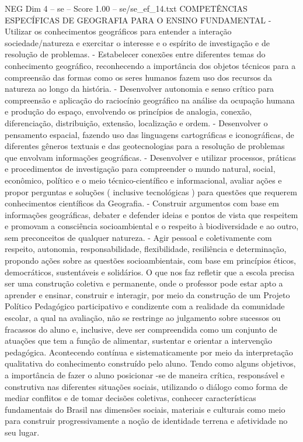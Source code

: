 \begin{textsample}{NEG Dim 4 – se – Score 1.00 – se/se\_ef\_14.txt}  \label{ex:f4_neg_150}
COMPETÊNCIAS ESPECÍFICAS DE GEOGRAFIA PARA O ENSINO FUNDAMENTAL - Utilizar os conhecimentos geográficos para entender a interação sociedade/natureza e exercitar o interesse e o espírito de investigação e de resolução de problemas. - Estabelecer conexões entre diferentes temas do conhecimento geográfico, reconhecendo a importância dos objetos técnicos para a compreensão das formas como os seres humanos fazem uso dos recursos da natureza ao longo da história. - Desenvolver autonomia e senso crítico para compreensão e aplicação do raciocínio geográfico na análise da ocupação humana e produção do espaço, envolvendo os princípios de analogia, conexão, diferenciação, distribuição, extensão, localização e ordem. - Desenvolver o pensamento espacial, fazendo uso das linguagens cartográficas e iconográficas, de diferentes gêneros textuais e das geotecnologias para a resolução de problemas que envolvam informações geográficas. - Desenvolver e utilizar processos, práticas e procedimentos de investigação para compreender o mundo natural, social, econômico, político e o meio técnico-científico e informacional, avaliar ações e propor perguntas e soluções ( inclusive tecnológicas ) para questões que requerem conhecimentos científicos da Geografia. - Construir argumentos com base em informações geográficas, debater e defender ideias e pontos de vista que respeitem e promovam a consciência socioambiental e o respeito à biodiversidade e ao outro, sem preconceitos de qualquer natureza. - Agir pessoal e coletivamente com respeito, autonomia, responsabilidade, flexibilidade, resiliência e determinação, propondo ações sobre as questões socioambientais, com base em princípios éticos, democráticos, sustentáveis e solidários.
O que nos faz refletir que a escola precisa ser uma construção coletiva e permanente, onde o professor pode estar apto a aprender e ensinar, construir e interagir, por meio da construção de um Projeto Político Pedagógico participativo e condizente com a realidade da comunidade escolar, a qual na avaliação, não se restringe ao julgamento sobre sucessos ou fracassos do aluno e, inclusive, deve ser compreendida como um conjunto de atuações que tem a função de alimentar, sustentar e orientar a intervenção pedagógica.
Acontecendo contínua e sistematicamente por meio da interpretação qualitativa do conhecimento construído pelo aluno.
Tendo como alguns objetivos, a importância de fazer o aluno posicionar -se de maneira crítica, responsável e construtiva nas diferentes situações sociais, utilizando o diálogo como forma de mediar conflitos e de tomar decisões coletivas, conhecer características fundamentais do Brasil nas dimensões sociais, materiais e culturais como meio para construir progressivamente a noção de identidade terrena e afetividade no seu lugar.

\end{textsample}
